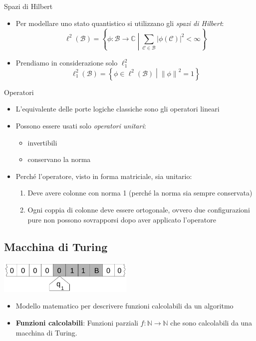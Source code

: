 \documentclass{beamer}
\def\spacedmiddle#1{\mathrel{}\middle#1\mathrel{}}
\begin{document}
\begin{frame}{\subsecname}{Spazi di Hilbert}
	\begin{itemize}
		\item Per modellare uno stato quantistico si utilizzano gli \textit{spazi di Hilbert}:
		\[ \ell^{2} \left ( \mathcal{B} \right ) = \left \{ \phi : \mathcal{B} \rightarrow \mathbb{C} \spacedmiddle | \sum_{\mathcal{C} \in \mathcal{B}} \left | \phi \left ( \mathcal{C} \right ) \right |^{2} < \infty \right \}\]
		\item Prendiamo in considerazione solo \(\ell^{2}_{1}\)
		\[ \ell^{2}_{1} \left ( \mathcal{B} \right ) = \left \{ \phi \in \ell^{2} \left ( \mathcal{B} \right ) \spacedmiddle | \left \| \phi \right \|^{2} = 1 \right \}\]
	\end{itemize}
\end{frame}

\begin{frame}{\subsecname}{Operatori}
	\begin{itemize}
		\item L'equivalente delle porte logiche classiche sono gli operatori lineari
		\item Possono essere usati solo \textit{operatori unitari}:
		\begin{itemize}
			\item invertibili
			\item conservano la norma
		\end{itemize}
		\item Perché l'operatore, visto in forma matriciale, sia unitario:
		\begin{enumerate}
			\item Deve avere colonne con norma 1 (perché la norma sia sempre conservata)
			\item Ogni coppia di colonne deve essere ortogonale, ovvero due configurazioni pure non possono sovrapporsi dopo aver applicato l'operatore
		\end{enumerate}
	\end{itemize}
\end{frame}

\subsection{Macchina di Turing}

\begin{frame}{\subsecname}{}
	\centering\includegraphics[width=6.5cm]{Turing_machine_2b.svg.png}
	\begin{itemize}
		\item Modello matematico per descrivere funzioni calcolabili da un algoritmo
		\item \textbf{Funzioni calcolabili}: Funzioni parziali \( f : \mathbb{N} \rightarrow \mathbb{N} \) che sono calcolabili da una macchina di Turing.
	\end{itemize}
\end{frame}
\end{document}
